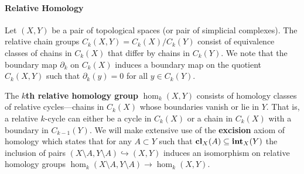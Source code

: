 \paragraph{Relative Homology}

Let $(X, Y)$ be a pair of topological spaces (or pair of simplicial complexes).
The relative chain groups $C_k(X, Y) = C_k(X) / C_k(Y)$ consist of equivalence classes of chains in $C_k(X)$ that differ by chains in $C_k(Y)$.
We note that the boundary map $\partial_k$ on $C_k(X)$ induces a boundary map on the quotient $C_k(X, Y)$ such that $\partial_k(y) = 0$ for all $y\in C_k(Y)$.

The \textbf{$k$th relative homology group} $\hom_k(X, Y)$ consists of homology classes of relative cycles---chains in $C_k(X)$ whose boundaries vanish or lie in $Y$.
That is, a relative $k$-cycle can either be a cycle in $C_k(X)$ or a chain in $C_k(X)$ with a boundary in $C_{k-1}(Y)$.
We will make extensive use of the \textbf{excision} axiom of homology which states that for any $A\subset Y$ such that $\mathbf{cl}_X(A)\subseteq \mathbf{int}_X(Y)$ the inclusion of pairs $(X\setminus A, Y\setminus A)\hookrightarrow (X, Y)$ induces an isomorphism on relative homology groups $\hom_k(X\setminus A, Y\setminus A)\to\hom_k(X, Y)$.
